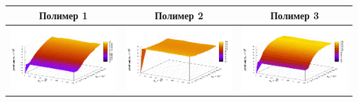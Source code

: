 \documentclass[12pt,a4paper]{article}
\theoremstyle{definition}
\begin{document}
\begin{table}[h]
  \centering
  \begin{tabular}{c c c}
	Полимер 1 & Полимер 2 & Полимер 3 \\ \hline
	\includegraphics[scale=0.4]{figs/resonance/p1.txt_coeff0.dat.pdf} & \includegraphics[scale=0.4]{figs/resonance/p2.txt_coeff0.dat.pdf} & \includegraphics[scale=0.4]{figs/resonance/p3.txt_coeff0.dat.pdf} \\

\end{tabular}
\end{table}
\end{document}
